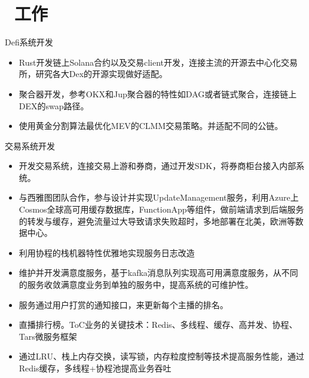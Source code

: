 \documentclass{resume}
\begin{document}
\section{\faUsers\ 工作}
Defi系统开发
\begin{itemize}
  \item Rust开发链上Solana合约以及交易client开发，连接主流的开源去中心化交易所，研究各大Dex的开源实现做好适配。
  \item 聚合器开发，参考OKX和Jup聚合器的特性如DAG或者链式聚合，连接链上DEX的swap路径。
  \item 使用黄金分割算法最优化MEV的CLMM交易策略。并适配不同的公链。
\end{itemize}

交易系统开发
\begin{itemize}
  \item 开发交易系统，连接交易上游和券商，通过开发SDK，将券商柜台接入内部系统。
\end{itemize}

\begin{itemize}
  \item 与西雅图团队合作，参与设计并实现UpdateManagement服务，利用Azure上Cosmos全球高可用缓存数据库，FunctionApp等组件，做前端请求到后端服务的转发与缓存，避免流量过大导致请求失败超时，多地部署在北美，欧洲等数据中心。
\end{itemize}

\begin{itemize}
  \item 利用协程的栈机器特性优雅地实现服务日志改造
  \item 维护并开发满意度服务，基于kafka消息队列实现高可用满意度服务，从不同的服务收敛满意度业务到单独的服务中，提高系统的可维护性。
\end{itemize}

\begin{itemize}
  \item 服务通过用户打赏的通知接口，来更新每个主播的排名。
  \item 直播排行榜。ToC业务的关键技术：Redis、多线程、缓存、高并发、协程、Tars微服务框架
  \item 通过LRU、栈上内存交换，读写锁，内存粒度控制等技术提高服务性能，通过Redis缓存，多线程+协程池提高业务吞吐
\end{itemize}
\end{document}
